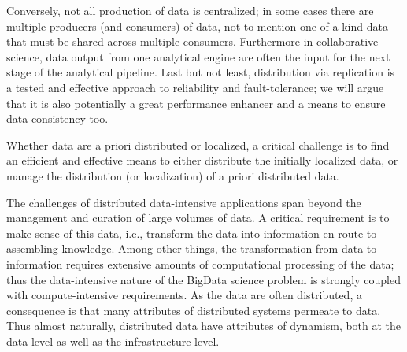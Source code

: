 Conversely, not all production of data is centralized; in some cases
there are multiple producers (and consumers) of data, not to mention
one-of-a-kind data that must be shared across multiple consumers.
Furthermore in collaborative science, data output from one analytical
engine are often the input for the next stage of the analytical
pipeline.  Last but not least, distribution via replication is a
tested and effective approach to reliability and fault-tolerance; we
will argue that it is also potentially a great performance enhancer
and a means to ensure data consistency too.

Whether data are a priori distributed or localized, a critical
challenge is to find an efficient and effective means to either
distribute the initially localized data, or manage the distribution
(or localization) of a priori distributed data.




The challenges of distributed data-intensive applications span beyond
the management and curation of large volumes of data. A critical
requirement is to make sense of this data, i.e., transform the data
into information en route to assembling knowledge. Among other things,
the transformation from data to information requires extensive amounts
of computational processing of the data; thus the data-intensive
nature of the BigData science problem is strongly coupled with
compute-intensive requirements.  As the data are often distributed, a
consequence is that many attributes of distributed systems permeate to
data. Thus almost naturally, distributed data have attributes of
dynamism, both at the data level as well as the infrastructure
level.

